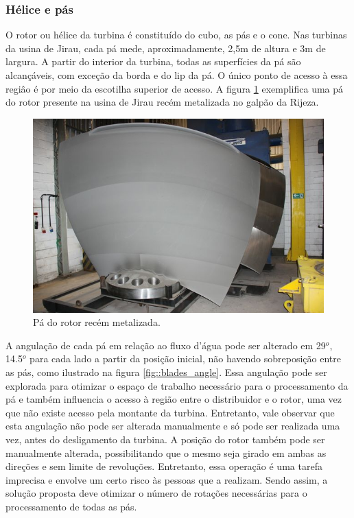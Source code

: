 \subsubsection{Hélice e pás}
 
O rotor ou hélice da turbina é constituído do cubo, as pás e o cone. 
Nas turbinas da usina de Jirau, cada pá mede, aproximadamente, 2,5m de altura e
3m de largura. A partir do interior da turbina, todas as superfícies da pá são
alcançáveis, com exceção da borda e do lip da pá. O único ponto de acesso à
essa regiâo é por meio da escotilha superior de acesso. A figura
\ref{fig::blade_rijeza} exemplifica uma pá do rotor presente na usina de Jirau recém metalizada no galpão da Rijeza.

\begin{figure}[h!]
	\centering	
	\includegraphics[width=0.7\columnwidth]{sota/figs/viagem/img_4887}
	\caption{Pá do rotor recém metalizada.}
	\label{fig::blade_rijeza}
\end{figure}

A angulação de cada pá em relação ao fluxo d'água pode ser alterado em 29$^o$,
14.5$^o$ para cada lado a partir da posição inicial, não havendo sobreposição
entre as pás, como ilustrado na figura \ref{fig::blades_angle}.
Essa angulação pode ser explorada para otimizar o espaço de trabalho necessário
para o processamento da pá e também influencia o acesso à região
entre o distribuidor e o rotor, uma vez que não existe acesso pela montante da
turbina. Entretanto, vale observar que esta angulação não pode ser alterada
manualmente e só pode ser realizada uma vez, antes do desligamento da turbina. A
posição do rotor também pode ser manualmente alterada, possibilitando que o mesmo seja girado em ambas as direções e sem limite de revoluções. Entretanto, essa operação é uma tarefa imprecisa e envolve um certo risco às pessoas que a realizam. Sendo
assim, a solução proposta deve otimizar o número de rotações necessárias para o processamento de todas as pás.

